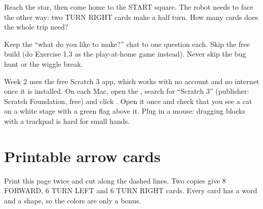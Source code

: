 \begin{stretchchallenge}
Reach the star, then come home to the START square. The robot needs to face the other way: two TURN RIGHT cards make a half turn. How many cards does the whole trip need?
\end{stretchchallenge}

\begin{teachernote}
Keep the \enquote{what do you like to make?} chat to one question each. Skip the free build (do Exercise 1.3 as the play-at-home game instead). Never skip the bug hunt or the wiggle break.
\end{teachernote}

\begin{teachernote}
Week 2 uses the free Scratch 3 app, which works with no account and no internet once it is installed. On each Mac, open the , search for \enquote{Scratch 3} (publisher: Scratch Foundation, free) and click . Open it once and check that you see a cat on a white stage with a green flag above it. Plug in a mouse: dragging blocks with a trackpad is hard for small hands.
\end{teachernote}

\clearpage
\section{Printable arrow cards}
Print this page twice and cut along the dashed lines. Two copies give 8 FORWARD, 6 TURN LEFT and 6 TURN RIGHT cards. Every card has a word and a shape, so the colors are only a bonus.

